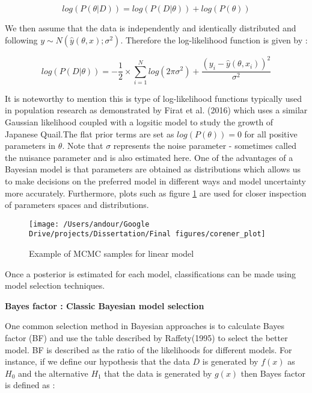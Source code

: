 \documentclass[12pt,]{article}
\begin{document}
\begin{equation}
log(P(\theta|D)) = log(P(D|\theta)) + log(P(\theta)) \label{eq:logbayes}
\end{equation}

We then assume that the data is independently and identically distributed and following \(y \sim N(\hat y(\theta,x);\sigma^2)\).
Therefore the log-likelihood function is given by :

\begin{equation}
log(P(D|\theta)) = -\frac {1} {2} \times  \sum_{i=1}^N log(2\pi\sigma^2) + \frac {(y_i - \hat y(\theta,x_i))^2} {\sigma^2}
\end{equation}

It is noteworthy to mention this is type of log-likelihood functions typically used in population research as demonstrated by Firat et al. (2016) which uses a similar Gaussian likelihood coupled with a logsitic model to study the growth of Japanese Quail.The flat prior terms are set as \(log(P(\theta)) = 0\) for all positive parameters in \(\theta\).
Note that \(\sigma\) represents the noise parameter - sometimes called the nuisance parameter and is also estimated here. One of the advantages of a Bayesian model is that parameters are obtained as distributions which allows us to make decisions on the preferred model in different ways and model uncertainty more accurately. Furthermore, plots such as figure \ref{fig:corner} are used for closer inspection of parameters spaces and distributions.

\begin{figure}

{\centering \texttt{[image: /Users/andour/Google Drive/projects/Dissertation/Final figures/corener\_plot]} 

}

\caption{Example of MCMC samples for linear model}\label{fig:corner}
\end{figure}

Once a posterior is estimated for each model, classifications can be made using model selection techniques.

\textbf{Bayes factor : Classic Bayesian model selection}

One common selection method in Bayesian approaches is to calculate Bayes factor (BF) and use the table described by Raffety(1995) to select the better model. BF is described as the ratio of the likelihoods for different models. For instance, if we define our hypothesis that the data \(D\) is generated by \(f(x)\) as \(H_0\) and the alternative \(H_1\) that the data is generated by \(g(x)\) then Bayes factor is defined as :
\end{document}
